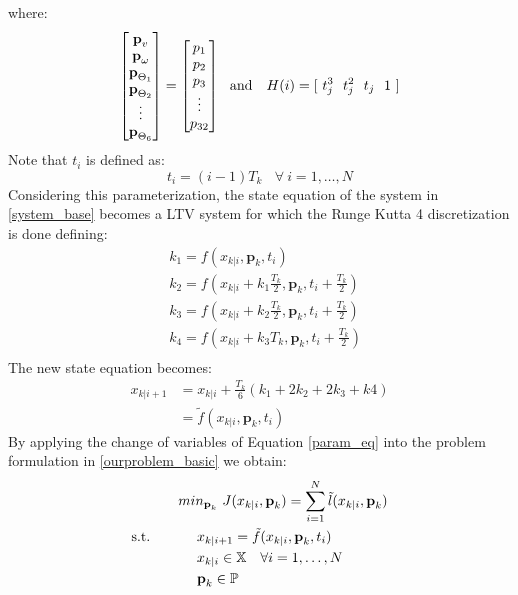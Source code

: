 where: 
\begin{equation}
\left[ \begin{matrix} \textbf{p}_v \\ \textbf{p}_{\omega} \\ \textbf{p}_{\Theta_1} \\ \textbf{p}_{\Theta_2} \\ \vdots \\ \textbf{p}_{\Theta_6} \end{matrix} \right] = \left[ \begin{matrix} p_1 \\ p_2 \\ p_3 \\ \vdots \\ p_{32} \end{matrix} \right]\ \ \textnormal{and }\ \ H(i)=[\ t_j^3\ \ t_j^2\ \ t_j\ \ 1\ ]
\end{equation}
Note that $t_i$  is defined as:
\begin{equation*}
	t_i=(i-1)T_k\ \ \ \ \forall\ i=1,\dots,N
\end{equation*}
Considering this parameterization, the state equation of the system in \ref{system_base} becomes a LTV system for which the Runge Kutta 4 discretization is done defining: 
\begin{equation*}
\begin{split}
    &k_1 = f(x_{k|i},\textbf{p}_k,t_i) \\
	&k_2 = f(x_{k|i}+k_1\frac{T_k}{2},\textbf{p}_k,t_i+\frac{T_k}{2}) \\
	&k_3 = f(x_{k|i}+k_2\frac{T_k}{2},\textbf{p}_k,t_i+\frac{T_k}{2})\\
	&k_4 = f(x_{k|i}+k_3T_k,\textbf{p}_k,t_i+\frac{T_k}{2})\\
\end{split}	
\end{equation*}
The new state equation becomes:  
\begin{equation}
\begin{split}
	x_{k|i+1}&=x_{k|i}+\frac{T_k}{6}(k_1+2k_2+2k_3+k4) \\
	&=\tilde{f}(x_{k|i},\textbf{p}_k,t_i)
\end{split}
\end{equation}
By applying the change of variables of Equation \ref{param_eq} into the problem formulation in \ref{ourproblem_basic} we obtain:
\begin{equation} \label{ourproblem_param}
\begin{split}
		& min_{\textbf{p}_k}\ J({x}_{k|i},\textbf{p}_k) = \sum_{i=1}^{N}\tilde{l}({x}_{k|i},\textbf{p}_k) \\
		\textnormal{s.t.}\qquad
		&\ \ \ \ x_{k|i+1}=\tilde{f}(x_{k|i},\textbf{p}_k,t_i) \\
		&\ \ \ \ {x}_{k|i} \in \mathbb{X}\quad \forall i=1,\dots, N  \\
		&\ \ \ \ \textbf{p}_k   \in \mathbb{P}\ \\
	\end{split}	
\end{equation}
